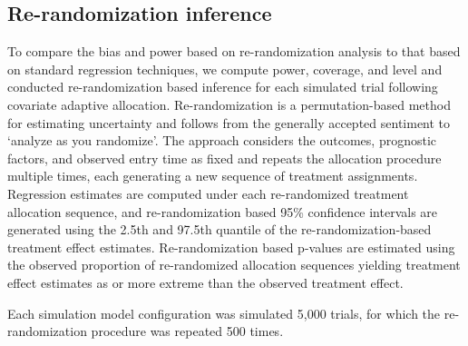 \subsection{Re-randomization inference}
To compare the bias and power based on re-randomization analysis to that based on standard regression techniques, we compute power, coverage, and level and conducted re-randomization based inference for each simulated trial following covariate adaptive allocation.  
Re-randomization is a permutation-based method for estimating uncertainty and follows from the generally accepted sentiment to ‘analyze as you randomize’.  
The approach considers the outcomes, prognostic factors, and observed entry time as fixed and repeats the allocation procedure multiple times, each generating a new sequence of treatment assignments.  
Regression estimates are computed under each re-randomized treatment allocation sequence, and re-randomization based 95\% confidence intervals are generated using the 2.5th and 97.5th quantile of the re-randomization-based treatment effect estimates.  
Re-randomization based p-values are estimated using the observed proportion of re-randomized allocation sequences yielding treatment effect estimates as or more extreme than the observed treatment effect.  

Each simulation model configuration was simulated 5,000 trials, for which the re-randomization procedure was repeated 500 times.

